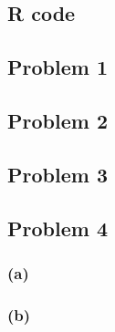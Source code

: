 \begin{appendices}
    \section{R code}

        \subsection*{Problem 1}

        \subsection*{Problem 2}

        \subsection*{Problem 3}

        \subsection*{Problem 4}
            \subsubsection*{(a)}
            \subsubsection*{(b)}

\end{appendices}

